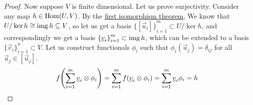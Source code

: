 \begin{proof}
    Now suppose \(V\) is finite dimensional.
    Let us prove surjectivity.
    Consider any map \(h \in \operatorname{Hom}(U,V)\).
    By the \hyperref[thm:iso-1-vsp]{first isomorphism theorem},
    We know that \(U/\ker h \cong \operatorname{img} h \subseteq V\),
    so let us get a basis \({\{[\vec{u}_i]\}}_{i=1}^m \subset U/\ker h\),
    and correspondingly we get a basis \({\{\underline{v}_i\}}_{i=1}^m \subset \operatorname{img} h\),
    which can be extended to a basis \({\{\vec{v}_i\}}_{i=1}^n \subset V\).
    Let us construct functionals \(\phi_i\)
    such that \(\phi_i(\vec{u}_j) = \delta_{ij}\) for all \(\vec{u}_j \in [\vec{u}_j]\).
    \begin{equation*}
        f\pqty{\sum_{i=1}^m \vec{v}_i\otimes\phi_i}
        = \sum_{i=1}^m f(\vec{v}_i\otimes\phi_i)
        = \sum_{i=1}^m \vec{v}_i\phi_i = h
    \end{equation*}
\end{proof}

